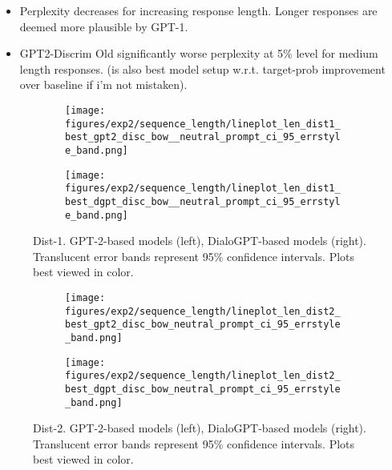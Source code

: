 \begin{itemize}
    \item Perplexity decreases for increasing response length. Longer responses are deemed more plausible by GPT-1.
    \item GPT2-Discrim Old significantly worse perplexity at 5\% level for medium length responses. (is also best model setup w.r.t. target-prob improvement over baseline if i'm not mistaken).
    
\end{itemize}

\begin{figure}[H]
     \centering
     \begin{subfigure}[b]{0.49\textwidth}
        \centering
\texttt{[image: figures/exp2/sequence\_length/lineplot\_len\_dist1\_best\_gpt2\_disc\_bow\_\_neutral\_prompt\_ci\_95\_errstyle\_band.png]}
        \caption{}
        \label{subfig:lineplot_length_dist1_np_gpt2}
     \end{subfigure}
     \hfill
     \begin{subfigure}[b]{0.49\textwidth}
        \centering
        \texttt{[image: figures/exp2/sequence\_length/lineplot\_len\_dist1\_best\_dgpt\_disc\_bow\_\_neutral\_prompt\_ci\_95\_errstyle\_band.png]}
        \caption{}
        \label{subfig:lineplot_length_dist1_np_dgpt}
     \end{subfigure}
        \caption{Dist-1. GPT-2-based models (left), DialoGPT-based models (right). Translucent error bands represent 95\% confidence intervals. Plots best viewed in color.}
        \label{fig:lineplots_length_dist1_np_gpt2_dgpt}
\end{figure}

\begin{figure}[H]
     \centering
     \begin{subfigure}[b]{0.49\textwidth}
        \centering
\texttt{[image: figures/exp2/sequence\_length/lineplot\_len\_dist2\_best\_gpt2\_disc\_bow\_neutral\_prompt\_ci\_95\_errstyle\_band.png]}
        \caption{}
        \label{subfig:lineplot_length_dist2_np_gpt2}
     \end{subfigure}
     \hfill
     \begin{subfigure}[b]{0.49\textwidth}
        \centering
        \texttt{[image: figures/exp2/sequence\_length/lineplot\_len\_dist2\_best\_dgpt\_disc\_bow\_neutral\_prompt\_ci\_95\_errstyle\_band.png]}
        \caption{}
        \label{subfig:lineplot_length_dist2_np_dgpt}
     \end{subfigure}
        \caption{Dist-2. GPT-2-based models (left), DialoGPT-based models (right). Translucent error bands represent 95\% confidence intervals. Plots best viewed in color.}
        \label{fig:lineplots_length_dist2_np_gpt2_dgpt}
\end{figure}

